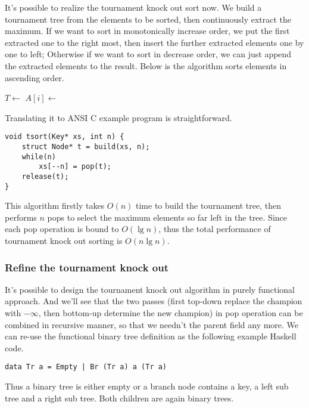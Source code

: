 \documentclass[UTF8]{article}
\begin{document}
It's possible to realize the tournament knock out sort now. We build a tournament tree from the elements
to be sorted, then continuously extract the maximum. If we want to sort in monotonically increase order,
we put the first extracted one to the right most, then insert the further extracted elements one by one
to left; Otherwise if we want to sort in decrease order, we can just append the extracted elements
to the result. Below is the algorithm sorts elements in ascending order.

\begin{algorithmic}
  \State $T \gets$ 
    \State $A[i] \gets$ 
  \EndFor
\EndProcedure
\end{algorithmic}

Translating it to ANSI C example program is straightforward.

\lstset{language=C}
\begin{lstlisting}
void tsort(Key* xs, int n) {
    struct Node* t = build(xs, n);
    while(n)
        xs[--n] = pop(t);
    release(t);
}
\end{lstlisting}

This algorithm firstly takes $O(n)$ time to build the tournament tree, then performs $n$ pops to select
the maximum elements so far left in the tree. Since each pop operation is bound to $O(\lg n)$, thus
the total performance of tournament knock out sorting is $O(n \lg n)$.

\subsubsection{Refine the tournament knock out}
It's possible to design the tournament knock out algorithm in purely functional approach. And we'll see
that the two passes (first top-down replace the champion with $-\infty$, then bottom-up determine the
new champion) in pop operation can be combined in recursive manner, so that we needn't the parent field
any more. We can re-use the functional binary tree definition as the following example Haskell code.

\lstset{language=Haskell}
\begin{lstlisting}
data Tr a = Empty | Br (Tr a) a (Tr a)
\end{lstlisting}

Thus a binary tree is either empty or a branch node contains a key, a left sub tree and a right sub tree.
Both children are again binary trees.
\end{document}
